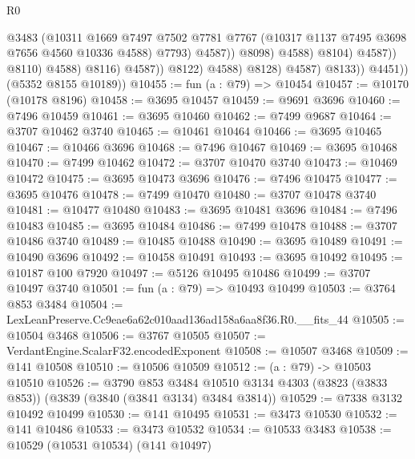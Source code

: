 \begin{lexlean}{R0}
\begin{coremodule}
                                              @3483
                                              (@10311
                                                @1669
                                                @7497
                                                @7502
                                                @7781
                                                @7767
                                                (@10317 @1137 @7495 @3698 @7656 @4560 @10336 @4588)
                                                @7793)
                                              @4587))
                                          @8098)
                                        @4588)
                                      @8104)
                                    @4587))
                                @8110)
                              @4588)
                            @8116)
                          @4587))
                      @8122)
                    @4588)
                  @8128)
                @4587)
              @8133))
          @4451))
      (@5352 @8155 @10189))
@10455 := fun (a : @79) => @10454
@10457 := @10170 (@10178 @8196)
@10458 := @3695 @10457
@10459 := @9691 @3696
@10460 := @7496 @10459
@10461 := @3695 @10460
@10462 := @7499 @9687
@10464 := @3707 @10462 @3740
@10465 := @10461 @10464
@10466 := @3695 @10465
@10467 := @10466 @3696
@10468 := @7496 @10467
@10469 := @3695 @10468
@10470 := @7499 @10462
@10472 := @3707 @10470 @3740
@10473 := @10469 @10472
@10475 := @3695 @10473 @3696
@10476 := @7496 @10475
@10477 := @3695 @10476
@10478 := @7499 @10470
@10480 := @3707 @10478 @3740
@10481 := @10477 @10480
@10483 := @3695 @10481 @3696
@10484 := @7496 @10483
@10485 := @3695 @10484
@10486 := @7499 @10478
@10488 := @3707 @10486 @3740
@10489 := @10485 @10488
@10490 := @3695 @10489
@10491 := @10490 @3696
@10492 := @10458 @10491
@10493 := @3695 @10492
@10495 := @10187 @100 @7920
@10497 := @5126 @10495 @10486
@10499 := @3707 @10497 @3740
@10501 := fun (a : @79) => @10493 @10499
@10503 := @3764 @853 @3484
@10504 := LexLeanPreserve.Cc9eae6a62c010aad136ad158a6aa8f36.R0.__fits_44
@10505 := @10504 @3468
@10506 := @3767 @10505
@10507 := VerdantEngine.ScalarF32.encodedExponent
@10508 := @10507 @3468
@10509 := @141 @10508
@10510 := @10506 @10509
@10512 := (a : @79) -> @10503 @10510
@10526 := @3790
    @853
    @3484
    @10510
    @3134
    @4303
    (@3823 (@3833 @853))
    (@3839 (@3840 (@3841 @3134) @3484 @3814))
@10529 := @7338 @3132 @10492 @10499
@10530 := @141 @10495
@10531 := @3473 @10530
@10532 := @141 @10486
@10533 := @3473 @10532
@10534 := @10533 @3483
@10538 := @10529 (@10531 @10534) (@141 @10497)

\end{coremodule}
\end{lexlean}
